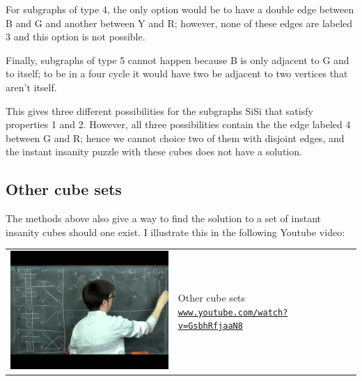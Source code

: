 \documentclass[10pt,]{book}
\theoremstyle{plain}
\theoremstyle{definition}
\theoremstyle{definition}
\theoremstyle{definition}
\theoremstyle{definition}
\numberwithin{equation}{section}
\begin{document}
\hypertarget{p-70}{}%
For subgraphs of type 4, the only option would be to have a double edge between B and G and another between Y and R; however, none of these edges are labeled 3 and this option is not possible.%
\par
\hypertarget{p-71}{}%
Finally, subgraphs of type 5 cannot happen because B is only adjacent to G and to itself; to be in a four cycle it would have two be adjacent to two vertices that aren’t itself.%
\par
\hypertarget{p-72}{}%
This gives three different possibilities for the subgraphs SiSi that satisfy properties 1 and 2. However, all three possibilities contain the the edge labeled 4 between G and R; hence we cannot choice two of them with disjoint edges, and the instant insanity puzzle with these cubes does not have a solution.%
\typeout{************************************************}
\typeout{************************************************}
\subsection[{Other cube sets}]{Other cube sets}\label{subsection-13}
\hypertarget{p-73}{}%
The methods above also give a way to find the solution to a set of instant insanity cubes should one exist.  I illustrate this in the following Youtube video:%
\begin{tabular}{m{.2\linewidth}m{.6\linewidth}}
\includegraphics[width=\linewidth]{images/video-1.jpg}&%
Other cube sets\newline%
\href{https://www.youtube.com/watch?v=GsbhRfjaaN8}{\texttt{\nolinkurl{www.youtube.com/watch?v=GsbhRfjaaN8}}}
\end{tabular}
\typeout{************************************************}
\typeout{************************************************}
\end{document}
